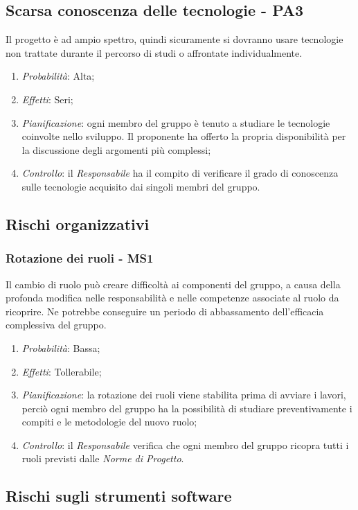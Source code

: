 \subsection{Scarsa conoscenza delle tecnologie - PA3}
Il progetto \`e ad ampio spettro, quindi sicuramente si dovranno usare tecnologie non trattate durante il percorso di studi o affrontate individualmente.
\begin{enumerate}
\item \textit{Probabilit\`a}: Alta;
\item \textit{Effetti}: Seri;
\item \textit{Pianificazione}: ogni membro del gruppo \`e tenuto a studiare le tecnologie coinvolte nello sviluppo. Il proponente ha offerto la propria disponibilit\`a per la discussione degli argomenti pi\`u complessi;
\item \textit{Controllo}: il \textit{Responsabile} ha il compito di verificare il grado di conoscenza sulle tecnologie acquisito dai singoli membri del gruppo.
\end{enumerate}

\subsection{Rischi organizzativi}
\subsubsection{Rotazione dei ruoli - MS1}
Il cambio di ruolo pu\`o creare difficolt\`a ai componenti del gruppo, a causa della profonda modifica nelle responsabilit\`a e nelle competenze associate al ruolo da ricoprire. Ne potrebbe conseguire un periodo di abbassamento dell'efficacia complessiva del gruppo.
\begin{enumerate}
\item \textit{Probabilit\`a}: Bassa;
\item \textit{Effetti}: Tollerabile;
\item \textit{Pianificazione}: la rotazione dei ruoli viene stabilita prima di avviare i lavori, perci\`o ogni membro del gruppo ha la possibilit\`a di studiare preventivamente i compiti e le metodologie del nuovo ruolo;
\item \textit{Controllo}: il \textit{Responsabile} verifica che ogni membro del gruppo ricopra tutti i ruoli previsti dalle \textit{Norme di Progetto}.
\end{enumerate}

\subsection{Rischi sugli strumenti software}
